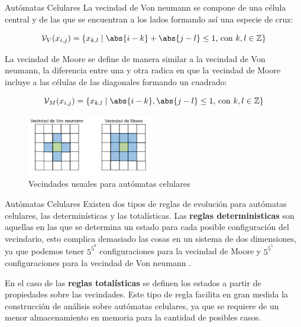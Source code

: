 \documentclass[9pt]{beamer}
\begin{document}
\begin{frame}{Autómatas Celulares}
La vecindad de Von neumann se compone de una célula central y de las que se encuentran a los lados formando así una especie de cruz:

$$\mathcal{V}_V(x_{i,j}) = \{x_{k,l}\mid\abs{i-k}+\abs{j-l}\leq1\text{, con }k,l\in\mathbb{Z}\}$$

La vecindad de Moore se define de manera similar a la vecindad de Von neumann, la diferencia entre una y otra radica en que la vecindad de Moore incluye a las células de las diagonales formando un cuadrado:

$$\mathcal{V}_M(x_{i,j}) = \{x_{k,l}\mid\abs{i-k},\abs{j-l}\leq1\text{, con }k,l\in\mathbb{Z}\}$$

\begin{figure}[h]
  \centering
    \includegraphics[width=0.5\textwidth]{Imagenes/vecindades.PNG}
  \caption{Vecindades usuales para autómatas celulares}
  \label{fig:Moore - Von neumann}
\end{figure}
\end{frame}

\begin{frame}{Autómatas Celulares}
Existen dos tipos de reglas de evolución para autómatas celulares, las determinísticas y las totalísticas. Las \textbf{reglas deterministicas} son aquellas en las que se determina un estado para cada posible configuración del vecindario, esto complica demasiado las cosas en un sistema de dos dimensiones, ya que podemos tener $5^{5^9}$ configuraciones para la vecindad de Moore y $5^{5^5}$ configuraciones para la vecindad de Von neumann \cite{ACaplicacionesComputacion}.

En el caso de las \textbf{reglas totalísticas} se definen los estados a partir de propiedades sobre las vecindades. Este tipo de regla facilita en gran medida la construcción de análisis sobre autómatas celulares, ya que se requiere de un menor almacenamiento en memoria para la cantidad de posibles casos.
\end{frame}

%
\end{document}
